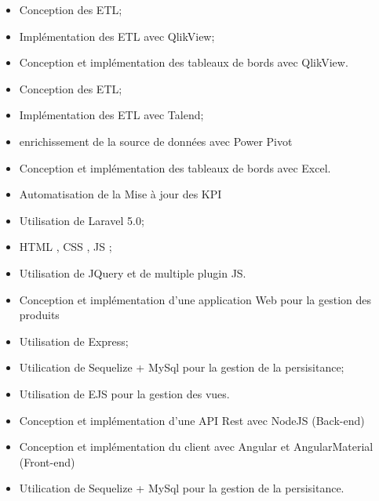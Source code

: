 \documentclass[11pt,a4paper]{moderncv}
\begin{document}
{%
\begin{itemize}%
	\item Conception des ETL;
	\item Implémentation des ETL avec QlikView;
	\item Conception et implémentation des tableaux de bords avec QlikView.
\end{itemize}}
%
{%
\begin{itemize}%
	\item Conception des ETL;
	\item Implémentation des ETL avec Talend;
	\item enrichissement de la source de données avec Power Pivot
	\item Conception et implémentation des tableaux de bords avec Excel.
\end{itemize}}
%
{%
\begin{itemize}%
	\item Automatisation de la Mise à jour des KPI
	\item Utilisation de Laravel 5.0;
	\item HTML , CSS , JS ;
	\item Utilisation de JQuery et de multiple plugin JS.
\end{itemize}}
%
{%
\begin{itemize}%
	\item Conception et implémentation d'une application Web pour la gestion des produits 
	\item Utilisation de Express;
	\item Utilication de Sequelize + MySql pour la gestion de la persisitance;
	\item Utilisation de EJS pour la gestion des vues.
\end{itemize}}
%
{%
\begin{itemize}%
	\item Conception et implémentation d'une API Rest avec NodeJS (Back-end)
	\item Conception et implémentation du client avec Angular et AngularMaterial (Front-end)
	\item Utilication de Sequelize + MySql pour la gestion de la persisitance.
\end{itemize}}
\end{document}
